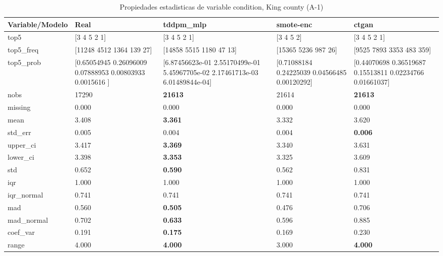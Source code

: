 \begin{table}[H]
\centering
\fontsize{8}{14}\selectfont
\caption{Propiedades  estadisticas de variable condition, King county (A-1)}
\label{table-stats-king county-a-1-condition}
\begin{tabular}{|l|m{10em}|m{10em}|m{10em}|m{10em}|}
\hline
 \rowcolor[gray]{0.8}
Variable/Modelo & Real & tddpm\_mlp & smote-enc & ctgan \\
\hline top5 & [3 4 5 2 1] & [3 4 5 2 1] & [3 4 5 2] & [3 4 5 2 1] \\
\hline top5\_freq & [11248  4512  1364   139    27] & [14858  5515  1180    47    13] & [15365  5236   987    26] & [9525 7893 3353  483  359] \\
\hline top5\_prob & [0.65054945 0.26096009 0.07888953 0.00803933 0.0015616 ] & [6.87456623e-01 2.55170499e-01 5.45967705e-02 2.17461713e-03
 6.01489844e-04] & [0.71088184 0.24225039 0.04566485 0.00120292] & [0.44070698 0.36519687 0.15513811 0.02234766 0.01661037] \\
\hline nobs & 17290 & \bfseries 21613 & \cellcolor[rgb]{0.9, 0.54, 0.52} 21614 & \bfseries 21613 \\
\hline missing & 0.000 & 0.000 & 0.000 & 0.000 \\
\hline mean & 3.408 & \bfseries 3.361 & 3.332 & \cellcolor[rgb]{0.9, 0.54, 0.52} 3.620 \\
\hline std\_err & 0.005 & 0.004 & \cellcolor[rgb]{0.9, 0.54, 0.52} 0.004 & \bfseries 0.006 \\
\hline upper\_ci & 3.417 & \bfseries 3.369 & 3.340 & \cellcolor[rgb]{0.9, 0.54, 0.52} 3.631 \\
\hline lower\_ci & 3.398 & \bfseries 3.353 & 3.325 & \cellcolor[rgb]{0.9, 0.54, 0.52} 3.609 \\
\hline std & 0.652 & \bfseries 0.590 & 0.562 & \cellcolor[rgb]{0.9, 0.54, 0.52} 0.831 \\
\hline iqr & 1.000 & 1.000 & 1.000 & 1.000 \\
\hline iqr\_normal & 0.741 & 0.741 & 0.741 & 0.741 \\
\hline mad & 0.560 & \bfseries 0.505 & 0.476 & \cellcolor[rgb]{0.9, 0.54, 0.52} 0.706 \\
\hline mad\_normal & 0.702 & \bfseries 0.633 & 0.596 & \cellcolor[rgb]{0.9, 0.54, 0.52} 0.885 \\
\hline coef\_var & 0.191 & \bfseries 0.175 & 0.169 & \cellcolor[rgb]{0.9, 0.54, 0.52} 0.230 \\
\hline range & 4.000 & \bfseries 4.000 & \cellcolor[rgb]{0.9, 0.54, 0.52} 3.000 & \bfseries 4.000 \\

\end{tabular}
\end{table}
